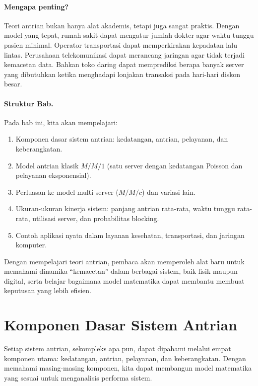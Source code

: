 \documentclass{bukumjh}
\begin{document}
\paragraph{Mengapa penting?}  
Teori antrian bukan hanya alat akademis, tetapi juga sangat praktis. Dengan model yang tepat, rumah sakit dapat mengatur jumlah dokter agar waktu tunggu pasien minimal. Operator transportasi dapat memperkirakan kepadatan lalu lintas. Perusahaan telekomunikasi dapat merancang jaringan agar tidak terjadi kemacetan data. Bahkan toko daring dapat memprediksi berapa banyak server yang dibutuhkan ketika menghadapi lonjakan transaksi pada hari-hari diskon besar.

\paragraph{Struktur Bab.}  
Pada bab ini, kita akan mempelajari:
\begin{enumerate}
    \item Komponen dasar sistem antrian: kedatangan, antrian, pelayanan, dan keberangkatan.
    \item Model antrian klasik $M/M/1$ (satu server dengan kedatangan Poisson dan pelayanan eksponensial).
    \item Perluasan ke model multi-server ($M/M/c$) dan variasi lain.
    \item Ukuran-ukuran kinerja sistem: panjang antrian rata-rata, waktu tunggu rata-rata, utilisasi server, dan probabilitas blocking.
    \item Contoh aplikasi nyata dalam layanan kesehatan, transportasi, dan jaringan komputer.
\end{enumerate}

Dengan mempelajari teori antrian, pembaca akan memperoleh alat baru untuk memahami dinamika “kemacetan” dalam berbagai sistem, baik fisik maupun digital, serta belajar bagaimana model matematika dapat membantu membuat keputusan yang lebih efisien.

\section{Komponen Dasar Sistem Antrian}

Setiap sistem antrian, sekompleks apa pun, dapat dipahami melalui empat komponen utama: {\jsg kedatangan}, {\jsg antrian}, {\jsg pelayanan}, dan {\jsg keberangkatan}. Dengan memahami masing-masing komponen, kita dapat membangun model matematika yang sesuai untuk menganalisis performa sistem.
\end{document}
